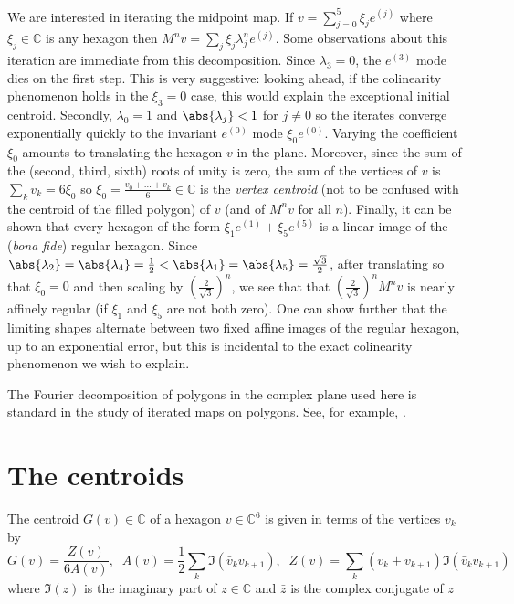 \documentclass{amsart}
\newcommand*\C{\mathbb C}
\DeclarePairedDelimiter\abs\lvert\rvert
\theoremstyle{definition}
\begin{document}
We are interested in iterating the midpoint map. If $v = \sum_{j=0}^5 \xi_je^{(j)}$ where $\xi_j \in \C$ is any hexagon then $M^nv = \sum_j \xi_j\lambda_j^ne^{(j)}$. Some observations about this iteration are immediate from this decomposition. Since $\lambda_3 = 0$, the $e^{(3)}$ mode dies on the first step. This is very suggestive: looking ahead, if the colinearity phenomenon holds in the $\xi_3=0$ case, this would explain the exceptional initial centroid. Secondly, $\lambda_0 = 1$ and $\abs{\lambda_j} < 1$ for $j\ne 0$ so the iterates converge exponentially quickly to the invariant $e^{(0)}$ mode $\xi_0e^{(0)}$. Varying the coefficient $\xi_0$ amounts to translating the hexagon $v$ in the plane. Moreover, since the sum of the (second, third, sixth) roots of unity is zero, the sum of the vertices of $v$ is $\sum_k v_k = 6\xi_0$ so $\xi_0 = \frac{v_0+\dots+v_k}{6}\in \C$ is the \emph{vertex centroid} (not to be confused with the centroid of the filled polygon) of $v$ (and of $M^nv$ for all $n$). Finally, it can be shown that every hexagon of the form $\xi_1e^{(1)} + \xi_5e^{(5)}$ is a linear image of the (\textit{bona fide}) regular hexagon. Since $\abs{\lambda_2}=\abs{\lambda_4}=\frac12 < \abs{\lambda_1}=\abs{\lambda_5} = \frac{\sqrt 3}{2}$, after translating so that $\xi_0=0$ and then scaling by $(\frac{2}{\sqrt 3})^n$, we see that that $(\frac{2}{\sqrt 3})^nM^nv$ is nearly affinely regular (if $\xi_1$ and $\xi_5$ are not both zero). One can show further that the limiting shapes alternate between two fixed affine images of the regular hexagon, up to an exponential error, but this is incidental to the exact colinearity phenomenon we wish to explain.

The Fourier decomposition of polygons in the complex plane used here is standard in the study of iterated maps on polygons. See, for example, \cite{Douglas1940,Schoenberg1950,Neumann1941}.

\section{The centroids}

The centroid $G(v) \in \C$ of a hexagon $v \in \C^6$ is given in terms of the vertices $v_k$ by
\begin{equation}
    G(v) = \frac{Z(v)}{6A(v)},
    \;\;
    A(v) = \frac12\sum_k \Im(\bar v_kv_{k+1}),
    \;\;
    Z(v) = \sum_k (v_k+v_{k+1})\Im(\bar v_kv_{k+1})
    \label{eq:shoelace}
\end{equation}
where $\Im(z)$ is the imaginary part of $z\in\C$ and $\bar z$ is the complex conjugate of $z$
\end{document}
